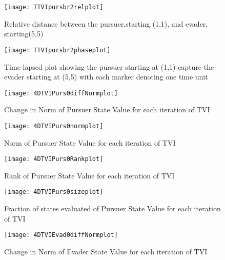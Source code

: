 \begin{figure}
\vspace{2.4in}
\centering
\texttt{[image: TTVIpursbr2relplot]}
\caption{Relative distance between the pursuer,starting (1,1), and evader, starting(5,5)}
\label{TTVIpursbr2relplot}
\end{figure}
\clearpage
\newpage

\begin{figure}
\vspace{2.4in}
\centering
\texttt{[image: TTVIpursbr2phaseplot]}
\caption{Time-lapsed plot showing the pursuer starting at (1,1) capture the evader starting at (5,5) with each marker denoting one time unit}
\label{TTVIpursbr2phaseplot}
\end{figure}
\clearpage
\newpage

\begin{figure}
\vspace{2.4in}
\centering
\texttt{[image: 4DTVIPurs0diffNormplot]}
\caption{Change in Norm of Pursuer State Value for each iteration of TVI}
\label{4DTVIPurs0diffNormplot}
\end{figure}
\clearpage
\newpage

\begin{figure}
\vspace{2.4in}
\centering
\texttt{[image: 4DTVIPurs0normplot]}
\caption{Norm of Pursuer State Value for each iteration of TVI}
\label{4DTVIPurs0normplot}
\end{figure}
\clearpage
\newpage

\begin{figure}
\vspace{2.4in}
\centering
\texttt{[image: 4DTVIPurs0Rankplot]}
\caption{Rank of Pursuer State Value for each iteration of TVI}
\label{4DTVIPurs0Rankplot}
\end{figure}
\clearpage
\newpage

\begin{figure}
\vspace{2.4in}
\centering
\texttt{[image: 4DTVIPurs0sizeplot]}
\caption{Fraction of states evaluated of Pursuer State Value for each iteration of TVI}
\label{4DTVIPurs0sizeplot}
\end{figure}
\clearpage
\newpage

\begin{figure}
\vspace{2.4in}
\centering
\texttt{[image: 4DTVIEvad0diffNormplot]}
\caption{Change in Norm of Evader State Value for each iteration of TVI}
\label{4DTVIEvad0diffNormplot}
\end{figure}
\clearpage
\newpage

